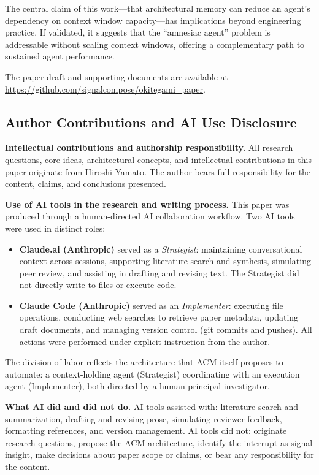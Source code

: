 \documentclass[conference]{IEEEtran}
\begin{document}
The central claim of this work---that architectural memory can reduce an agent's dependency on context window capacity---has implications beyond engineering practice. If validated, it suggests that the ``amnesiac agent'' problem is addressable without scaling context windows, offering a complementary path to sustained agent performance.

The paper draft and supporting documents are available at \url{https://github.com/signalcompose/okitegami_paper}.

\subsection*{Author Contributions and AI Use Disclosure}

\textbf{Intellectual contributions and authorship responsibility.}
All research questions, core ideas, architectural concepts, and intellectual contributions in this paper originate from Hiroshi Yamato. The author bears full responsibility for the content, claims, and conclusions presented.

\textbf{Use of AI tools in the research and writing process.}
This paper was produced through a human-directed AI collaboration workflow. Two AI tools were used in distinct roles:

\begin{itemize}
\item \textbf{Claude.ai (Anthropic)} served as a \emph{Strategist}: maintaining conversational context across sessions, supporting literature search and synthesis, simulating peer review, and assisting in drafting and revising text. The Strategist did not directly write to files or execute code.
\item \textbf{Claude Code (Anthropic)} served as an \emph{Implementer}: executing file operations, conducting web searches to retrieve paper metadata, updating draft documents, and managing version control (git commits and pushes). All actions were performed under explicit instruction from the author.
\end{itemize}

The division of labor reflects the architecture that ACM itself proposes to automate: a context-holding agent (Strategist) coordinating with an execution agent (Implementer), both directed by a human principal investigator.

\textbf{What AI did and did not do.}
AI tools assisted with: literature search and summarization, drafting and revising prose, simulating reviewer feedback, formatting references, and version management. AI tools did not: originate research questions, propose the ACM architecture, identify the interrupt-as-signal insight, make decisions about paper scope or claims, or bear any responsibility for the content.
\end{document}
